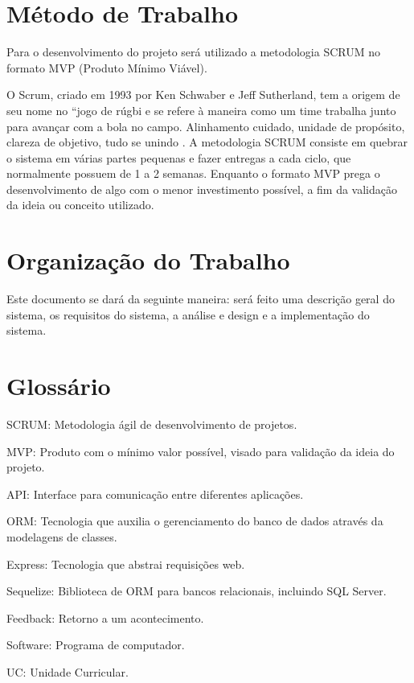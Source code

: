 \section{Método de Trabalho}
Para o desenvolvimento do projeto será utilizado a metodologia SCRUM no formato MVP (Produto Mínimo Viável).

O Scrum, criado em 1993 por Ken Schwaber e Jeff Sutherland, tem a origem de seu nome no “jogo de rúgbi e se refere à maneira como um time trabalha junto para avançar com a bola no campo. Alinhamento cuidado, unidade de propósito, clareza de objetivo, tudo se unindo \cite{rocha2015metodologia}.
A metodologia SCRUM consiste em quebrar o sistema em várias partes pequenas e fazer entregas a cada ciclo, que normalmente possuem de 1 a 2 semanas.
Enquanto o formato MVP prega o desenvolvimento de algo com o menor investimento possível, a fim da validação da ideia ou conceito utilizado.

\section{Organização do Trabalho}
Este documento se dará da seguinte maneira: será feito uma descrição geral do sistema, os requisitos do sistema, a análise e design e a implementação do sistema.

\section{Glossário}
SCRUM:		Metodologia ágil de desenvolvimento de projetos.

MVP:		Produto com o mínimo valor possível, visado para validação da ideia do projeto.

API:		Interface para comunicação entre diferentes aplicações.

ORM:		Tecnologia que auxilia o gerenciamento do banco de dados através da modelagens de classes.

Express:	Tecnologia que abstrai requisições web.

Sequelize:	Biblioteca de ORM para bancos relacionais, incluindo SQL Server.

Feedback:	Retorno a um acontecimento.

Software:	Programa de computador.

UC:			Unidade Curricular.

